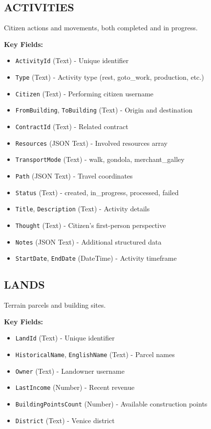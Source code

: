 \documentclass[11pt,a4paper]{article}
\begin{document}
\subsection{ACTIVITIES}

Citizen actions and movements, both completed and in progress.

\textbf{Key Fields:}
\begin{itemize}
\item \texttt{ActivityId} (Text) - Unique identifier
\item \texttt{Type} (Text) - Activity type (rest, goto\_work, production, etc.)
\item \texttt{Citizen} (Text) - Performing citizen username
\item \texttt{FromBuilding}, \texttt{ToBuilding} (Text) - Origin and destination
\item \texttt{ContractId} (Text) - Related contract
\item \texttt{Resources} (JSON Text) - Involved resources array
\item \texttt{TransportMode} (Text) - walk, gondola, merchant\_galley
\item \texttt{Path} (JSON Text) - Travel coordinates
\item \texttt{Status} (Text) - created, in\_progress, processed, failed
\item \texttt{Title}, \texttt{Description} (Text) - Activity details
\item \texttt{Thought} (Text) - Citizen's first-person perspective
\item \texttt{Notes} (JSON Text) - Additional structured data
\item \texttt{StartDate}, \texttt{EndDate} (DateTime) - Activity timeframe
\end{itemize}

\subsection{LANDS}

Terrain parcels and building sites.

\textbf{Key Fields:}
\begin{itemize}
\item \texttt{LandId} (Text) - Unique identifier
\item \texttt{HistoricalName}, \texttt{EnglishName} (Text) - Parcel names
\item \texttt{Owner} (Text) - Landowner username
\item \texttt{LastIncome} (Number) - Recent revenue
\item \texttt{BuildingPointsCount} (Number) - Available construction points
\item \texttt{District} (Text) - Venice district
\end{itemize}
\end{document}

